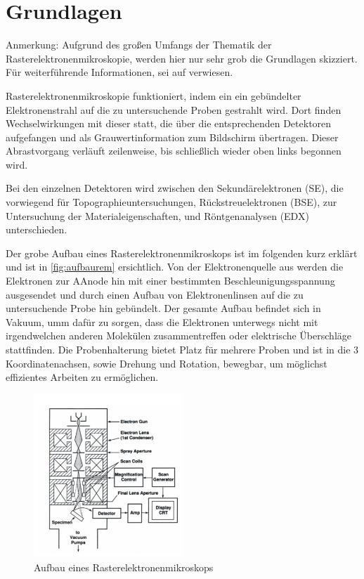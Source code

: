 \documentclass[12pt,english,ngerman]{scrartcl}
\begin{document}
\section{Grundlagen}

Anmerkung: Aufgrund des großen Umfangs der Thematik der Rasterelektronenmikroskopie, werden hier nur sehr grob die 
Grundlagen skizziert. Für weiterführende Informationen, sei auf \cite{unterlagen} verwiesen.


Rasterelektronenmikroskopie funktioniert, indem ein ein gebündelter Elektronenstrahl auf die zu untersuchende Proben
gestrahlt wird. Dort finden Wechselwirkungen mit dieser statt, die über die entsprechenden Detektoren aufgefangen und
als Grauwertinformation zum Bildschirm übertragen. Dieser Abrastvorgang verläuft zeilenweise, bis schließlich wieder 
oben links begonnen wird.

Bei den einzelnen Detektoren wird zwischen den Sekundärelektronen (SE), die vorwiegend für Topographieuntersuchungen, 
Rückstreuelektronen (BSE), zur Untersuchung der Materialeigenschaften, und Röntgenanalysen (EDX) unterschieden.

Der grobe Aufbau eines Rasterelektronenmikroskops ist im folgenden kurz erklärt und ist in \autoref{fig:aufbaurem} ersichtlich.
Von der Elektronenquelle aus werden die Elektronen zur AAnode hin mit einer bestimmten Beschleunigungsspannung ausgesendet
und durch einen Aufbau von Elektronenlinsen auf die zu untersuchende Probe hin gebündelt. Der gesamte Aufbau befindet sich
in Vakuum, umm dafür zu sorgen, dass die Elektronen unterwegs nicht mit irgendwelchen anderen Molekülen zusammentreffen oder
elektrische Überschläge stattfinden. Die Probenhalterung bietet Platz für mehrere Proben und ist in die 3 Koordinatenachsen,
sowie Drehung und Rotation, bewegbar, um möglichst effizientes Arbeiten zu ermöglichen.\cite{unterlagen}


\begin{figure}[]
	\begin{center}
		\includegraphics[width =0.5\textwidth]{./figures/aufbaurem.png}
	\end{center}
	\caption[Aufbau eines Rasterelektronenmikroskops]
	{Aufbau eines Rasterelektronenmikroskops \cite{unterlagen}}
    \label{fig:aufbaurem}
\end{figure}
\end{document}

